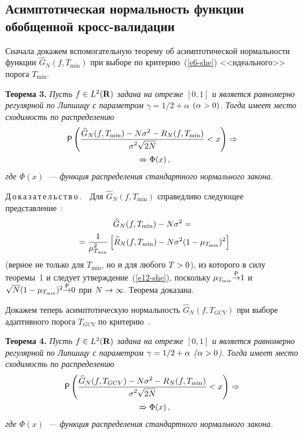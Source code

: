 \begin{multicols}{2}
\section{Асимптотическая нормальность функции обобщенной кросс-валидации}

Сначала докажем вспомогательную теорему об асимптотической нормальности функции $\widehat{G}_N(f,T_{\min})$ при выборе по 
критерию~(\ref{e6-she}) <<идеального>> порога $T_{\min}$.

\smallskip

\noindent
\textbf{Теорема 3.} \textit{Пусть $f\hm\in L^2(\mathbf{R})$ задана на отрезке $[0,1]$ и является равномерно 
регулярной по Липшицу с параметром $\gamma={1}/{2}+\alpha$ $(\alpha\hm>0)$. Тогда имеет место сходимость по распределению
\begin{multline}
{\sf P}\left(\displaystyle\frac{\displaystyle \widehat{G}_N(f,T_{\min})-N\sigma^2-R_N(f,T_{\min})\mathstrut}{\displaystyle \sigma^2\sqrt{2N}\mathstrut}<x\right)\Rightarrow{}\\
{}\Rightarrow\Phi(x)\,,\label{e12-she}
\end{multline}
где $\Phi(x)$~--- функция распределения стандартного нормального закона.}

\smallskip

\noindent
Д\,о\,к\,а\,з\,а\,т\,е\,л\,ь\,с\,т\,в\,о\,.\ \  Для $\widehat{G}_N(f,T_{\min})$ справедливо следующее представление~\cite{12-she}:
\begin{multline}
\widehat{G}_N(f,T_{\min})-N\sigma^2={}\\
{}=\displaystyle\frac{\displaystyle 1\mathstrut}{\displaystyle \mu_{T_{\min}}^2\mathstrut}\left[\widehat{R}_N(f,T_{\min})-N\sigma^2(1-\mu_{T_{\min}})^2\right]
\label{e13-she}
\end{multline}
(верное не только для $T_{\min}$, но и для любого $T\hm>0$), из которого в силу теоремы~1 и следует утверждение~(\ref{e12-she}), 
поскольку $\mu_{T_{\min}}{\stackrel{{\sf P}}{\rightarrow}}1$ и $\sqrt{N}(1\hm-\mu_{T_{\min}})^2{\stackrel{{\sf P}}{\rightarrow}}0$ при 
$N\hm\rightarrow\infty$. Теорема доказана.

\smallskip

Докажем теперь асимптотическую нормальность $\widehat{G}_N(f,T_{GCV})$ при выборе адаптивного порога $T_{GCV}$ по критерию~\cite{10-she}.


\smallskip

\noindent
\textbf{Теорема 4.} \textit{Пусть $f\hm\in L^2(\mathbf{R})$ задана на отрезке $[0,1]$ и является равномерно 
регулярной по Липшицу с параметром $\gamma\hm={1}/{2}+\alpha$ ($\alpha\hm>0$). Тогда имеет место сходимость по распределению
\begin{multline}
{\sf P}\left(\displaystyle\frac{\displaystyle \widehat{G}_N(f,T_{GCV})-N\sigma^2-R_N(f,T_{\min})\mathstrut}{\displaystyle \sigma^2\sqrt{2N}\mathstrut}<x\right)\Rightarrow{}\\
{}\Rightarrow\Phi(x)\,,\label{e14-she}
\end{multline}
где $\Phi(x)$~--- функция распределения стандартного нормального закона.}


\end{multicols}
